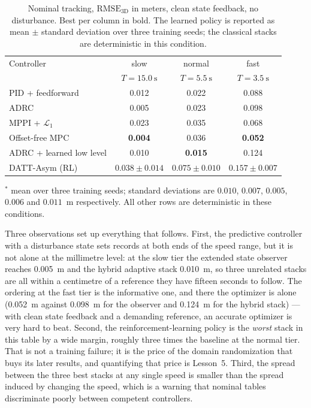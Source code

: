 \begin{table}[t]
\caption{Nominal tracking, $\mathrm{RMSE}_{\mathrm{3D}}$ in meters, clean state
feedback, no disturbance. Best per column in bold. The learned policy is reported as
mean $\pm$ standard deviation over three training seeds; the classical stacks are
deterministic in this condition.}
\label{tab:nominal}
\begin{center}\small
\begin{tabular}{lccc}
\toprule
Controller & slow & normal & fast \\
           & $T=\SI{15.0}{\second}$ & $T=\SI{5.5}{\second}$ & $T=\SI{3.5}{\second}$ \\
\midrule
PID + feedforward        & 0.012 & 0.022 & 0.088 \\
ADRC                     & 0.005 & 0.023 & 0.098 \\
MPPI + $\mathcal{L}_1$   & 0.023 & 0.035 & 0.068 \\
Offset-free MPC          & \textbf{0.004} & 0.036 & \textbf{0.052} \\
ADRC + learned low level & 0.010 & \textbf{0.015} & 0.124 \\
DATT-Asym (RL)           & $0.038\pm0.014$ & $0.075\pm0.010$ & $0.157\pm0.007$ \\
\bottomrule
\end{tabular}
\end{center}
{\footnotesize $^{\ast}$ mean over three training seeds; standard deviations are
$0.010$, $0.007$, $0.005$, $0.006$ and $0.011$~m respectively. All other rows are
deterministic in these conditions.\par}
\end{table}

Three observations set up everything that follows. First, the predictive controller with
a disturbance state sets records at both ends of the speed range, but it is not alone at
the millimetre level: at the slow tier the extended state observer reaches
\SI{0.005}{\meter} and the hybrid adaptive stack \SI{0.010}{\meter}, so three unrelated
stacks are all within a centimetre of a reference they have fifteen seconds to follow.
The ordering at the fast tier is the informative one, and there the optimizer is alone
(\SI{0.052}{\meter} against \SI{0.098}{\meter} for the observer and \SI{0.124}{\meter}
for the hybrid stack) --- with clean state feedback and a demanding reference, an
accurate optimizer is very hard to beat. Second, the reinforcement-learning policy is the \emph{worst}
stack in this table by a wide margin, roughly three times the baseline at the normal
tier. That is not a training failure; it is the price of the domain randomization that
buys its later results, and quantifying that price is Lesson~5. Third, the spread
between the three best stacks at any single speed is smaller than the spread induced by
changing the speed, which is a warning that nominal tables discriminate poorly between
competent controllers.

